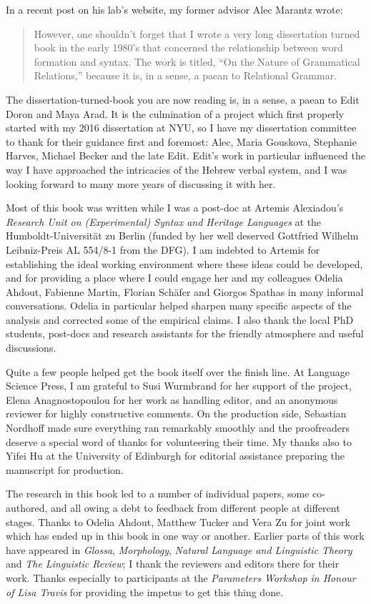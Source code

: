 \addchap{\lsAcknowledgementTitle} 

In a recent post on his lab's website, my former advisor Alec Marantz wrote:
\begin{quote}
	However, one shouldn't forget that I wrote a very long dissertation turned book in the early 1980's that concerned the relationship between word formation and syntax. The work is titled, ``On the Nature of Grammatical Relations,'' because it is, in a sense, a paean to Relational Grammar.
\end{quote}
The dissertation-turned-book you are now reading is, in a sense, a paean to Edit Doron and Maya Arad. It is the culmination of a project which first properly started with my 2016 dissertation at NYU, so I have my dissertation committee to thank for their guidance first and foremost: Alec, Maria Gouskova, Stephanie Harves, Michael Becker and the late Edit. Edit's work in particular influenced the way I have approached the intricacies of the Hebrew verbal system, and I was looking forward to many more years of discussing it with her.

Most of this book was written while I was a post-doc at Artemis Alexiadou's \emph{Research Unit on (Experimental) Syntax and Heritage Languages} at the Humboldt-Universit\"at zu Berlin (funded by her well deserved Gottfried Wilhelm Leibniz-Preis AL 554/8-1 from the DFG). I am indebted to Artemis for establishing the ideal working environment where these ideas could be developed, and for providing a place where I could engage her and my colleagues Odelia Ahdout, Fabienne Martin, Florian Sch\"afer and Giorgos Spathas in many informal conversations. Odelia in particular helped sharpen many specific aspects of the analysis and corrected some of the empirical claims. I also thank the local PhD students, post-docs and research assistants for the friendly atmosphere and useful discussions.

Quite a few people helped get the book itself over the finish line. At Language Science Press, I am grateful to Susi Wurmbrand for her support of the project, Elena Anagnostopoulou for her work as handling editor, and an anonymous reviewer for highly constructive comments. On the production side, Sebastian Nordhoff made sure everything ran remarkably smoothly and the proofreaders deserve a special word of thanks for volunteering their time. My thanks also to Yifei Hu at the University of Edinburgh for editorial assistance preparing the manuscript for production.

The research in this book led to a number of individual papers, some co-au\-thored, and all owing a debt to feedback from different people at different stages. Thanks to Odelia Ahdout, Matthew Tucker and Vera Zu for joint work which has ended up in this book in one way or another. Earlier parts of this work have appeared in \emph{Glossa}, \emph{Morphology}, \emph{Natural Language and Linguistic Theory} and \emph{The Linguistic Review}; I thank the reviewers and editors there for their work. Thanks especially to participants at the \emph{Parameters Workshop in Honour of Lisa Travis} for providing the impetus to get this thing done.

